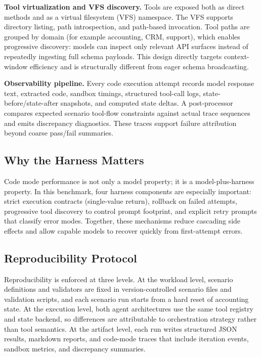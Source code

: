 \documentclass[journal,article,submit,pdftex,moreauthors]{Definitions/mdpi}
\begin{document}
\textbf{Tool virtualization and VFS discovery.} Tools are exposed both as direct methods and as a virtual filesystem (VFS) namespace. The VFS supports directory listing, path introspection, and path-based invocation. Tool paths are grouped by domain (for example accounting, CRM, support), which enables progressive discovery: models can inspect only relevant API surfaces instead of repeatedly ingesting full schema payloads. This design directly targets context-window efficiency and is structurally different from eager schema broadcasting.

\textbf{Observability pipeline.} Every code execution attempt records model response text, extracted code, sandbox timings, structured tool-call logs, state-before/state-after snapshots, and computed state deltas. A post-processor compares expected scenario tool-flow constraints against actual trace sequences and emits discrepancy diagnostics. These traces support failure attribution beyond coarse pass/fail summaries.

\subsection{Why the Harness Matters}

Code mode performance is not only a model property; it is a model-plus-harness property. In this benchmark, four harness components are especially important: strict execution contracts (single-value return), rollback on failed attempts, progressive tool discovery to control prompt footprint, and explicit retry prompts that classify error modes. Together, these mechanisms reduce cascading side effects and allow capable models to recover quickly from first-attempt errors.

\subsection{Reproducibility Protocol}

Reproducibility is enforced at three levels. At the workload level, scenario definitions and validators are fixed in version-controlled scenario files and validation scripts, and each scenario run starts from a hard reset of accounting state. At the execution level, both agent architectures use the same tool registry and state backend, so differences are attributable to orchestration strategy rather than tool semantics. At the artifact level, each run writes structured JSON results, markdown reports, and code-mode traces that include iteration events, sandbox metrics, and discrepancy summaries.
\end{document}
